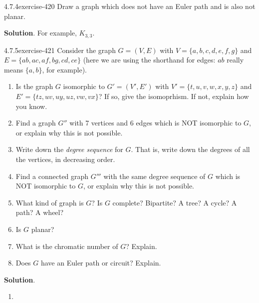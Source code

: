 \documentclass[twoside,11pt,]{book}
\numberwithin{equation}{chapter}
\begin{document}
\begin{divisionsolution}{4.7.4}{}{exercise-420}%
\hypertarget{p-4911}{}%
Draw a graph which does not have an Euler path and is also not planar.%
\par\smallskip%
\noindent\textbf{Solution}.\quad%
\hypertarget{p-4912}{}%
For example, \(K_{3,3}\).%
\end{divisionsolution}%
\begin{divisionsolution}{4.7.5}{}{exercise-421}%
\hypertarget{p-4913}{}%
Consider the graph \(G = (V, E)\) with \(V = \{a,b,c,d,e,f,g\}\) and \(E = \{ab, ac, af, bg,
cd, ce\}\) (here we are using the shorthand for edges: \(ab\) really means \(\{a,b\}\), for example).\leavevmode%
\begin{enumerate}[label=(\alph*)]
\item\hypertarget{li-2354}{}\hypertarget{p-4914}{}%
Is the graph \(G\) isomorphic to \(G' = (V', E')\) with \(V' = \{t, u, v, w, x, y, z\}\) and \(E' = \{tz, uv,
uy, uz, vw,
vx\}\)? If so, give the isomoprhism. If not, explain how you know.%
\item\hypertarget{li-2355}{}\hypertarget{p-4915}{}%
Find a graph \(G''\) with 7 vertices and 6 edges which is NOT isomorphic to \(G\), or explain why this is not possible.%
\item\hypertarget{li-2356}{}\hypertarget{p-4916}{}%
Write down the \emph{degree sequence} for \(G\). That is, write down the degrees of all the vertices, in decreasing order.%
\item\hypertarget{li-2357}{}\hypertarget{p-4917}{}%
Find a connected graph \(G'''\) with the same degree sequence of \(G\) which is NOT isomorphic to \(G\), or explain why this is not possible.%
\item\hypertarget{li-2358}{}\hypertarget{p-4918}{}%
What kind of graph is \(G\)? Is \(G\) complete? Bipartite? A tree? A cycle? A path? A wheel?%
\item\hypertarget{li-2359}{}\hypertarget{p-4919}{}%
Is \(G\) planar?%
\item\hypertarget{li-2360}{}\hypertarget{p-4920}{}%
What is the chromatic number of \(G\)? Explain.%
\item\hypertarget{li-2361}{}\hypertarget{p-4921}{}%
Does \(G\) have an Euler path or circuit? Explain.%
\end{enumerate}
%
\par\smallskip%
\noindent\textbf{Solution}.\quad%
\hypertarget{p-4922}{}%
\leavevmode%
\begin{enumerate}[label=(\alph*)]
\item\hypertarget{li-2362}{}\hypertarget{p-4923}{}%

\end{enumerate}
\end{divisionsolution}
\end{document}
